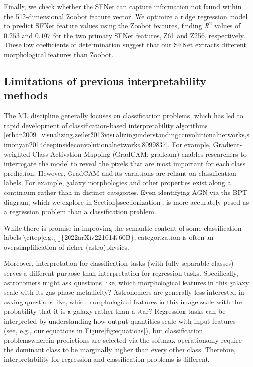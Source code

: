 \documentclass[11pt,a4paper]{article}
\begin{document}
Finally, we check whether the SFNet can capture information not found within the 512-dimensional Zoobot feature vector. We optimize a ridge regression model to predict SFNet feature values  using the Zoobot features, finding $R^2$ values of $0.253$ and $0.107$ for the two primary SFNet features, Z61 and Z256, respectively. These low coefficients of determination suggest that our SFNet extracts different morphological features than Zoobot.

\subsection{Limitations of previous interpretability methods}

The ML discipline generally focuses on classification problems, which has led to rapid development of classification-based interpretability algorithms [erhan2009\_visualizing,zeiler2013visualizingunderstandingconvolutionalnetworks,simonyan2014deepinsideconvolutionalnetworks,8099837]. For example, Gradient-weighted Class Activation Mapping (GradCAM; gradcam) enables researchers to interrogate the model to reveal the pixels that are most important for each class prediction. However, GradCAM and its variations are reliant on classification labels.
For example, galaxy morphologies and other properties exist along a continuum rather than in distinct categories. Even identifying AGN via the BPT diagram, which we explore in Section[ssec:ionization], is more accurately posed as a regression problem than a classification problem.

While there is promise in improving the semantic content of some classification labels \textbackslash{}citep[e.g.,][]\{2022arXiv221014760B\}, categorization is often an oversimplification of richer (astro)physics.

Moreover, interpretation for classification tasks (with fully separable classes) serves a different purpose than interpretation for regression tasks. Specifically, astronomers might ask questions like, which morphological features in this galaxy scale with its gas-phase metallicity? Astronomers are generally less interested in asking questions like, which morphological features in this image scale with the probability that it is a galaxy rather than a star? Regression tasks can be interpreted by understanding how output quantities scale with input features (see, e.g., our equations in Figure[fig:equations]), but classification problemswherein predictions are selected via the softmax operationonly require the dominant class to be marginally higher than every other class. 
Therefore, interpretability for regression and classification problems is different.
\end{document}
